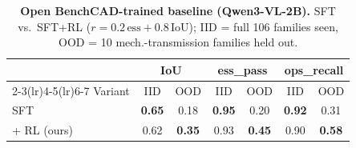 \begin{table}[t]
\centering
\small
\setlength{\tabcolsep}{6pt}
\caption{\textbf{Open BenchCAD-trained baseline (Qwen3-VL-2B).} SFT vs.\ SFT+RL ($r{=}0.2\,\mathrm{ess}{+}0.8\,\mathrm{IoU}$); IID = full 106 families seen, OOD = 10 mech.-transmission families held out.}
\label{tab:training_compact}
\begin{tabular}{@{}lcccccc@{}}
\toprule
            & \multicolumn{2}{c}{\textbf{IoU}} & \multicolumn{2}{c}{\textbf{ess\_pass}} & \multicolumn{2}{c}{\textbf{ops\_recall}} \\
\cmidrule(lr){2-3}\cmidrule(lr){4-5}\cmidrule(lr){6-7}
Variant     & IID            & OOD            & IID            & OOD            & IID            & OOD            \\
\midrule
SFT         & \textbf{0.65}  & 0.18           & \textbf{0.95}  & 0.20           & \textbf{0.92}  & 0.31           \\
+ RL (ours) & 0.62           & \textbf{0.35}  & 0.93           & \textbf{0.45}  & 0.90           & \textbf{0.58}  \\
\bottomrule
\end{tabular}
\end{table}
